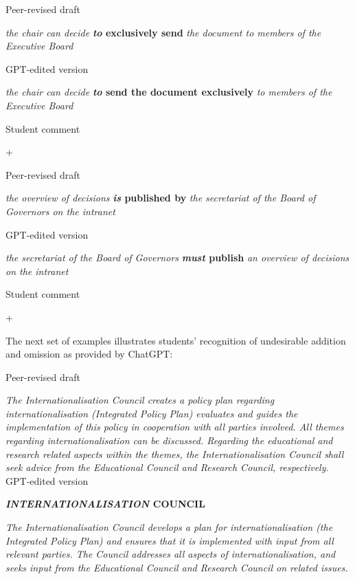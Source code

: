 \documentclass[output=paper]{langscibook}
\begin{document}
\ea%
    \label{ex:10:2}
    \ea  Peer-revised draft

    \textit{the chair can decide} \textbf{\textit{to} \textbf{exclusively} \textbf{send}} \textit{the document to members of the Executive Board}

    \ex  GPT-edited version

    \textit{the chair can decide} \textbf{\textit{to} \textbf{send} \textbf{the} \textbf{document} \textbf{exclusively}} \textit{to members of the Executive Board}

    \ex   Student comment

    +
    \z
\z

\ea%
    \label{ex:10:3}
    \ea  Peer-revised draft

    \textit{the overview of decisions} \textbf{\textit{is} \textbf{published} \textbf{by}} \textit{the secretariat of the Board of Governors on the intranet}

    \ex  GPT-edited version

    \textit{the secretariat of the Board of Governors} \textbf{\textit{must} \textbf{publish}} \textit{an overview of decisions on the intranet}

    \ex   Student comment

    +
\z
\z

The next set of examples  illustrates students’ recognition of undesirable addition and omission as provided by ChatGPT:

\ea%
    \label{ex:10:4}
    \ea  Peer-revised draft

\textit{The Internationalisation Council creates a policy plan regarding internationalisation (Integrated Policy Plan) evaluates and guides the implementation of this policy in cooperation with all parties involved. All themes regarding internationalisation can be discussed. Regarding the educational and research related aspects within the themes, the Internationalisation Council shall seek advice from the Educational Council and Research Council, respectively.}
    \ex  GPT-edited version

    \textbf{\textit{INTERNATIONALISATION} \textbf{COUNCIL}}

    \textit{The Internationalisation Council develops a plan for internationalisation (the Integrated Policy Plan) and ensures that it is implemented with input from all relevant parties. The Council addresses all aspects of internationalisation, and seeks input from the Educational Council and Research Council on related issues.}
\end{document}
